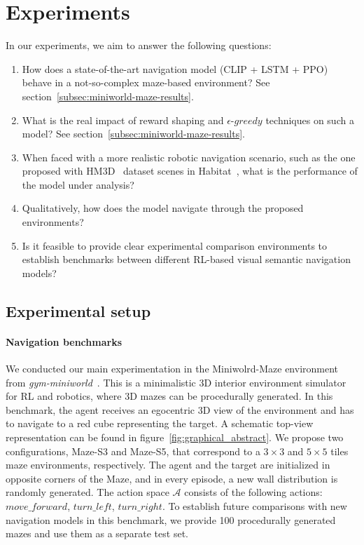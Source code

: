 \section{Experiments}
\label{sec:experiments}

In our experiments, we aim to answer the following questions:
\begin{enumerate}
    \item How does a state-of-the-art navigation model (CLIP + LSTM + PPO) behave in a not-so-complex maze-based environment?
    See section~\ref{subsec:miniworld-maze-results}.
    \item What is the real impact of reward shaping and $\epsilon\text{-}greedy$ techniques on such a model?
    See section~\ref{subsec:miniworld-maze-results}.
    \item When faced with a more realistic robotic navigation scenario, such as the one proposed with HM3D~\cite{ramakrishnan2021} dataset scenes in Habitat~\cite{szot2021}, what is the performance of the model under analysis?
    \item Qualitatively, how does the model navigate through the proposed environments?
    \item Is it feasible to provide clear experimental comparison environments to establish benchmarks between different RL-based visual semantic navigation models?
\end{enumerate}

\subsection{Experimental setup}\label{subsec:experimental-setup}



\paragraph{Navigation benchmarks}
We conducted our main experimentation in the Miniwolrd-Maze environment from \textit{gym-miniworld}~\cite{gym_miniworld}.
This is a minimalistic 3D interior environment simulator for RL and robotics, where 3D mazes can be procedurally generated.
In this benchmark, the agent receives an egocentric 3D view of the environment and has to navigate to a red cube representing the target.
A schematic top-view representation can be found in figure~\ref{fig:graphical_abstract}.
We propose two configurations, Maze-S3 and Maze-S5, that correspond to a $3\times3$ and $5\times5$ tiles maze environments, respectively.
The agent and the target are initialized in opposite corners of the Maze, and in every episode, a new wall distribution is randomly generated.
The action space $\mathcal{A}$ consists of the following actions: $move\_forward$, $turn\_left$, $turn\_right$.
To establish future comparisons with new navigation models in this benchmark, we provide 100 procedurally generated mazes and use them as a separate test set.


